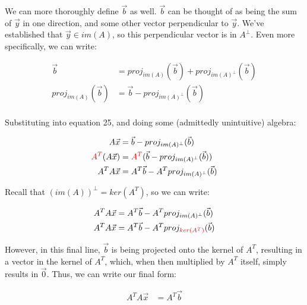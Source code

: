 \documentclass[12pt]{article}
\begin{document}
We can more thoroughly define $\vec{b}$ as well. $\vec{b}$ can be thought of as being the sum of $\vec{y}$ in one direction, and some other vector perpendicular to $\vec{y}$. We've established that $\vec{y} \in im(A)$, so this perpendicular vector is in $A^\bot$. Even more specifically, we can write:

\begin{equation}
    \begin{split}
       \vec{b} &= proj_{im(A)}(\vec{b}) + proj_{im(A)^\bot}(\vec{b})\\
       proj_{im(A)}(\vec{b}) &= \vec{b} - proj_{im(A)^\bot}(\vec{b})\\
    \end{split}
\end{equation}

Substituting into equation 25, and doing some (admittedly unintuitive) algebra:

\begin{equation}
    \begin{split}
        A\vec{x} &= \vec{b} - proj_{im(A)^\bot}(\vec{b})\\
        \textcolor{red}{A^T}(A\vec{x}) &= \textcolor{red}{A^T}(\vec{b} - proj_{im(A)^\bot}(\vec{b}))\\
        A^T A \vec{x} &= A^{T} \vec{b} - A^{T} proj_{im(A)^\bot}(\vec{b})\\
    \end{split}
\end{equation}

Recall that $(im(A))^\bot = ker(A^T)$, so we can write:

\begin{equation}
    \begin{split}
        A^T A \vec{x} &= A^{T} \vec{b} - A^{T} proj_{im(A)^\bot}(\vec{b})\\
        A^T A \vec{x} &= A^{T} \vec{b} - A^{T} proj_{\textcolor{red}{ker(A^T)}}(\vec{b})
    \end{split}
\end{equation}

However, in this final line, $\vec{b}$ is being projected onto the kernel of $A^T$, resulting in a vector in the kernel of $A^T$, which, when then multiplied by $A^T$ itself, simply results in $\vec{0}$. Thus, we can write our final form:

\begin{equation}
    \begin{split}
        A^T A \vec{x} &= A^{T} \vec{b}\\
    \end{split}
\end{equation}
\end{document}
